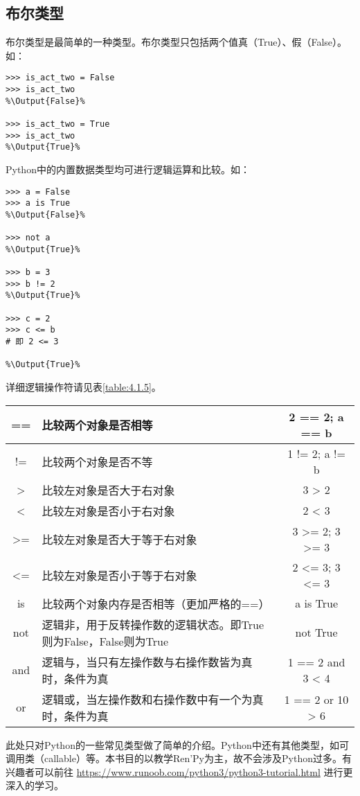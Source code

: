 \subsection{布尔类型}
布尔类型是最简单的一种类型。布尔类型只包括两个值真（True）、假（False）。如：
\begin{lstlisting}
>>> is_act_two = False
>>> is_act_two
%\Output{False}%

>>> is_act_two = True
>>> is_act_two
%\Output{True}%
\end{lstlisting}

Python中的内置数据类型均可进行逻辑运算和比较。如：
\begin{lstlisting}
>>> a = False
>>> a is True
%\Output{False}%

>>> not a
%\Output{True}%

>>> b = 3
>>> b != 2
%\Output{True}%

>>> c = 2
>>> c <= b
# 即 2 <= 3

%\Output{True}%
\end{lstlisting}
详细逻辑操作符请见表\ref{table:4.1.5}。

\begin{center}
    \tabletail{\hline}
    \tablelasttail{\hline}
    \label{table:4.1.5}
    \begin{supertabular}{|c|p{8cm}|c|}
        \hline
        == & 比较两个对象是否相等 & 2 == 2; a == b\\
        \hline
        != & 比较两个对象是否不等 & 1 != 2; a != b\\
        \hline
        > & 比较左对象是否大于右对象 & 3 > 2\\
        \hline
        < & 比较左对象是否小于右对象 & 2 < 3\\
        \hline
        >= & 比较左对象是否大于等于右对象 & 3 >= 2; 3 >= 3\\
        \hline
        <= & 比较左对象是否小于等于右对象 & 2 <= 3; 3 <= 3\\
        \hline
        is & 比较两个对象内存是否相等（更加严格的==）& a is True\\
        \hline
        not & 逻辑非，用于反转操作数的逻辑状态。即True则为False，False则为True & not True\\
        \hline
        and & 逻辑与，当只有左操作数与右操作数皆为真时，条件为真 & 1 == 2 and 3 < 4\\
        \hline
        or & 逻辑或，当左操作数和右操作数中有一个为真时，条件为真 & 1 == 2 or 10 > 6\\
        \hline
    \end{supertabular}
\end{center}

\begin{ExtraKnowledge}
    此处只对Python的一些常见类型做了简单的介绍。Python中还有其他类型，如可调用类（callable）等。本书目的以教学Ren'Py为主，故不会涉及Python过多。有兴趣者可以前往 \url{https://www.runoob.com/python3/python3-tutorial.html} 进行更深入的学习。
\end{ExtraKnowledge}

